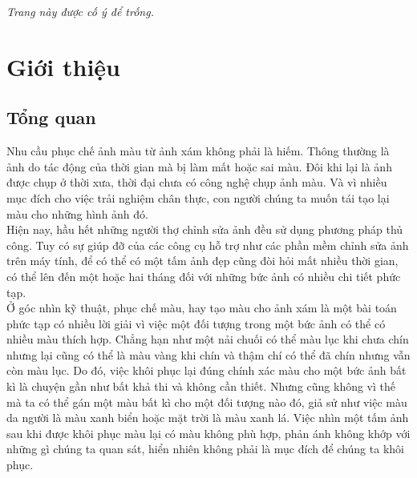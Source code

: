 \documentclass[a4paper, 12pt]{article}
\begin{document}
\newpage

\tableofcontents

\newpage

\renewcommand{\listfigurename}{Danh sách hình}
\listoffigures

\newpage

\listoftables

\newpage
\vspace*{\fill}
{\centering \textit{Trang này được cố ý để trống.}\par}
\vspace{\fill}

\newpage

\fancyfoot[R]{\scriptsize \ttfamily {\thepage}/\pageref{LastPage}}

\section{Giới thiệu}

\subsection{Tổng quan}
Nhu cầu phục chế ảnh màu từ ảnh xám không phải là hiếm. Thông thường là ảnh do tác động của thời gian mà bị làm mất hoặc sai màu. Đôi khi lại là ảnh được chụp ở thời xưa, thời đại chưa có công nghệ chụp ảnh màu. Và vì nhiều mục đích cho việc trải nghiệm chân thực, con người chúng ta muốn tái tạo lại màu cho những hình ảnh đó.\vspace{5pt}\\
Hiện nay, hầu hết những người thợ chỉnh sửa ảnh đều sử dụng phương pháp thủ công. Tuy có sự giúp đỡ của các công cụ hỗ trợ như các phần mềm chỉnh sửa ảnh trên máy tính, để có thể có một tấm ảnh đẹp cũng đòi hỏi mất nhiều thời gian, có thể lên đến một hoặc hai tháng đối với những bức ảnh có nhiều chi tiết phức tạp.\vspace{5pt}\\
Ở góc nhìn kỹ thuật, phục chế màu, hay tạo màu cho ảnh xám là một bài toán phức tạp có nhiều lời giải vì việc một đối tượng trong một bức ảnh có thể có nhiều màu thích hợp. Chẳng hạn như một nải chuối có thể màu lục khi chưa chín nhưng lại cũng có thể là màu vàng khi chín và thậm chí có thể đã chín nhưng vẫn còn màu lục. Do đó, việc khôi phục lại đúng chính xác màu cho một bức ảnh bất kì là chuyện gần như bất khả thi và không cần thiết. Nhưng cũng không vì thế mà ta có thể gán một màu bất kì cho một đối tượng nào đó, giả sử như việc màu da người là màu xanh biển hoặc mặt trời là màu xanh lá. Việc nhìn một tấm ảnh sau khi được khôi phục màu lại có màu không phù hợp, phản ánh không khớp với những gì chúng ta quan sát, hiển nhiên không phải là mục đích để chúng ta khôi phục.\vspace{5pt}\\
\end{document}

